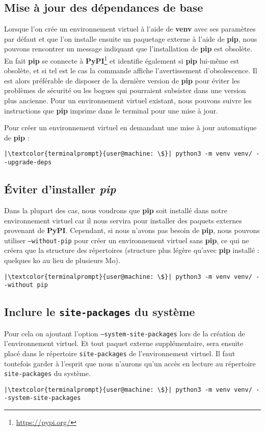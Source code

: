 \subsection*{Mise à jour des dépendances de base}
Lorsque l'on crée un environnement virtuel à l'aide de \textbf{venv} avec ses paramètres par défaut et que l'on installe ensuite un paquetage externe à l'aide de \textbf{pip}, nous pouvons rencontrer un message indiquant que l'installation de \textbf{pip} est obsolète. En fait \textbf{pip} se connecte à \textbf{PyPI}\footnote{\url{https://pypi.org/}} et identifie également si \textbf{pip} lui-même est obsolète, et si tel est le cas la commande affiche l'avertissement d'obsolescence.  Il est alors préférable de disposer de la dernière version de \textbf{pip} pour éviter les problèmes de sécurité ou les bogues qui pourraient subsister dans une version plus ancienne. Pour un environnement virtuel existant, nous pouvons suivre les instructions que \textbf{pip} imprime dans le terminal pour une mise à jour.

Pour créer un environnement virtuel en demandant une mise à jour automatique de \textbf{pip} :
\begin{lstlisting}[style=terminal]
|\textcolor{terminalprompt}{user@machine: \$}| python3 -m venv venv/ --upgrade-deps
\end{lstlisting}

\subsection*{Éviter d'installer \textit{pip}}
Dans la plupart des cas, nous voudrons que \textbf{pip} soit installé dans notre environnement virtuel car il nous servira pour installer des paquets externes provenant de \textbf{PyPI}. Cependant, si nous n'avons pas besoin de \textbf{pip}, nous pouvons utiliser \texttt{--without-pip} pour créer un environnement virtuel sans \textbf{pip}, ce qui ne créera que la structure des répertoires (structure plus légère qu'avec \textbf{pip} installé : quelques ko au lieu de plusieurs Mo).
\begin{lstlisting}[style=terminal]
|\textcolor{terminalprompt}{user@machine: \$}| python3 -m venv venv/ --without pip
\end{lstlisting}

\subsection*{Inclure le \texttt{site-packages} du système}
Pour cela on ajoutant l'option \texttt{--system-site-packages} lors de la création de l'environnement virtuel. Et tout paquet externe supplémentaire, sera ensuite placé dans le répertoire \texttt{site-packages} de l'environnement virtuel. Il faut toutefois garder à l'esprit que nous n'aurons qu'un accès en lecture au répertoire \texttt{site-packages} du système.
\begin{lstlisting}[style=terminal]
|\textcolor{terminalprompt}{user@machine: \$}| python3 -m venv venv/ --system-site-packages
\end{lstlisting}

